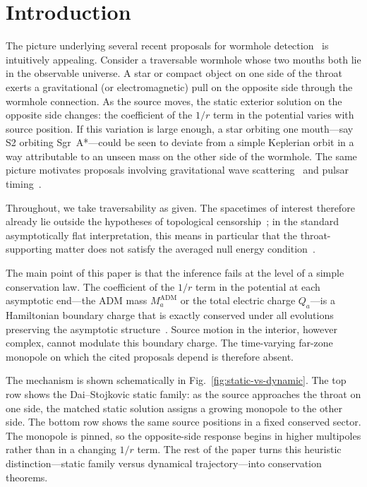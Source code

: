 \documentclass[aps,prd,onecolumn,nofootinbib,superscriptaddress]{revtex4-2}
\begin{document}
\section{Introduction}
\label{sec:intro}

The picture underlying several recent proposals for wormhole
detection~\cite{DaiStojkovic2019Observing,DaiStojkovic2020ReplyObserving,%
SimonettiEtAl2021SensitiveSearches,BaoHouZhang2023GWScattering,%
BambiStojkovic2021AstrophysicalWormholes} is intuitively appealing.
Consider a traversable wormhole whose two mouths both lie in the observable
universe.  A star or compact object on one side of the throat exerts a
gravitational (or electromagnetic) pull on the opposite side through the
wormhole connection.  As the source moves, the static exterior solution on the
opposite side changes: the coefficient of the $1/r$ term in the potential
varies with source position.  If this variation is large enough, a star
orbiting one mouth---say S2 orbiting Sgr~A*---could be seen to deviate from a
simple Keplerian orbit in a way attributable to an unseen mass on the other
side of the wormhole.  The same picture motivates proposals involving
gravitational wave scattering~\cite{BaoHouZhang2023GWScattering} and pulsar
timing~\cite{SimonettiEtAl2021SensitiveSearches}.

Throughout, we take traversability as given.  The spacetimes of interest
therefore already lie outside the hypotheses of topological
censorship~\cite{FriedmanSchleichWitt1993TopologicalCensorship}; in the
standard asymptotically flat interpretation, this means in particular that the
throat-supporting matter does not satisfy the averaged null energy
condition~\cite{MorrisThorne1988Wormholes,MorrisThorneYurtsever1988TimeMachines,Visser1995LorentzianWormholes}.

The main point of this paper is that the inference fails at the level of a
simple conservation law.  The coefficient of the $1/r$ term in the potential
at each asymptotic end---the ADM mass $M_a^{\mathrm{ADM}}$ or the total
electric charge $Q_a$---is a Hamiltonian boundary charge that is exactly
conserved under all evolutions preserving the asymptotic
structure~\cite{ArnowittDeserMisner1962Dynamics,ReggeTeitelboim1974SurfaceIntegrals,Bartnik1986Mass}.
Source motion in the interior, however complex, cannot modulate this boundary
charge.  The time-varying far-zone monopole on which the cited proposals depend
is therefore absent.

The mechanism is shown schematically in Fig.~\ref{fig:static-vs-dynamic}.  The
top row shows the Dai--Stojkovic static family: as the source approaches the
throat on one side, the matched static solution assigns a growing monopole to
the other side.  The bottom row shows the same source positions in a fixed
conserved sector.  The monopole is pinned, so the opposite-side response begins
in higher multipoles rather than in a changing $1/r$ term.  The rest of the
paper turns this heuristic distinction---static family versus dynamical
trajectory---into conservation theorems.
\end{document}
